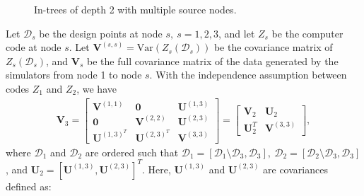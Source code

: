 \documentclass[12pt]{article}
\newcommand{\bs}[1]{\boldsymbol{#1}}
\begin{document}
\begin{figure}[H]
    \centering
    \caption{In-trees of depth 2 with multiple source nodes.}\label{fig:APP_extendedGraph}
\end{figure}

Let $\mathcal{D}_s$ be the design points at node $s,\ s=1,2,3$, and let $Z_s$ be the computer code at node $s$. Let $\bs{V}^{(s,s)}=\text{Var}(Z_s(\mathcal{D}_s))$ be the covariance matrix of $Z_s(\mathcal{D}_s)$, and $\bs{V}_s$ be the full covariance matrix of the data generated by the simulators from node 1 to node $s$. With the independence assumption between codes $Z_1$ and $Z_2$, we have 
\begin{align*}
\bs{V}_3 = 
    \begin{bmatrix}
        \bs{V}^{(1,1)} & \bs{0} & \bs{U}^{(1,3)}\\
        \bs{0} & \bs{V}^{(2,2)} & \bs{U}^{(2,3)}\\
        \bs{U}^{(1,3)^T} & \bs{U}^{(2,3)^T} & \bs{V}^{(3,3)}
    \end{bmatrix} =
    \begin{bmatrix}
        \bs{V}_2 & \bs{U}_2\\
        \bs{U}_2^T & \bs{V}^{(3,3)}
    \end{bmatrix},
\end{align*}
where $\mathcal{D}_1$ and $\mathcal{D}_2$ are ordered such that $\mathcal{D}_1=[\mathcal{D}_1\setminus \mathcal{D}_3,\mathcal{D}_3],\ \mathcal{D}_2=[\mathcal{D}_2\setminus \mathcal{D}_3,\mathcal{D}_3]$, and $\bs{U}_2=\left[\bs{U}^{(1,3)},\bs{U}^{(2,3)}\right]^T$. Here, $\bs{U}^{(1,3)}$ and $\bs{U}^{(2,3)}$ are covariances defined as:
\end{document}
